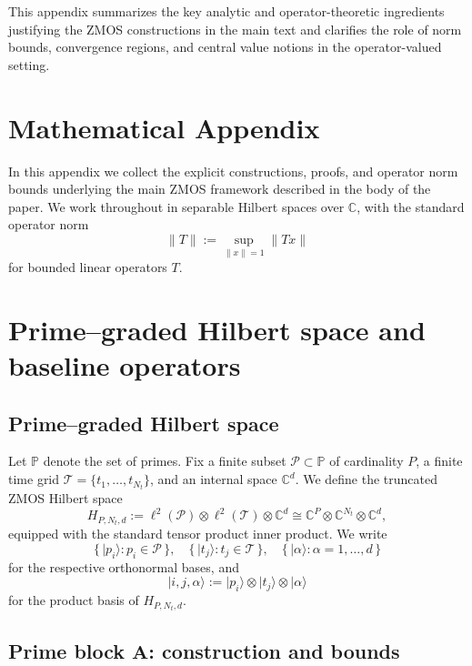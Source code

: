 \documentclass[11pt]{article}
\begin{document}
\bigskip

This appendix summarizes the key analytic and operator-theoretic
ingredients justifying the ZMOS constructions in the main text and
clarifies the role of norm bounds, convergence regions, and central
value notions in the operator-valued setting.

\appendix
\section*{Mathematical Appendix}

In this appendix we collect the explicit constructions, proofs, and operator norm bounds underlying the main ZMOS framework described in the body of the paper.
We work throughout in separable Hilbert spaces over $\mathbb{C}$, with the standard operator norm
\[
\|T\| := \sup_{\|x\|=1} \|Tx\|
\]
for bounded linear operators $T$.

\section{Prime–graded Hilbert space and baseline operators}
\label{app:prime-graded}

\subsection{Prime–graded Hilbert space}

Let $\mathbb{P}$ denote the set of primes.
Fix a finite subset $\mathcal{P} \subset \mathbb{P}$ of cardinality $P$, a finite time grid $\mathcal{T} = \{t_1,\dots,t_{N_t}\}$, and an internal space $\mathbb{C}^d$.
We define the truncated ZMOS Hilbert space
\[
H_{P,N_t,d}
  := \ell^2(\mathcal{P}) \otimes \ell^2(\mathcal{T}) \otimes \mathbb{C}^d
  \cong \mathbb{C}^P \otimes \mathbb{C}^{N_t} \otimes \mathbb{C}^d,
\]
equipped with the standard tensor product inner product.
We write
\[
\bigl\{\,\lvert p_i\rangle : p_i \in \mathcal{P}\,\bigr\},\quad
\bigl\{\,\lvert t_j\rangle : t_j \in \mathcal{T}\,\bigr\},\quad
\bigl\{\,\lvert \alpha\rangle : \alpha=1,\dots,d\,\bigr\}
\]
for the respective orthonormal bases, and
\[
\lvert i,j,\alpha\rangle := \lvert p_i\rangle \otimes \lvert t_j\rangle \otimes \lvert \alpha\rangle
\]
for the product basis of $H_{P,N_t,d}$.

\subsection{Prime block \texorpdfstring{$\mathbf{A}$}{A}: construction and bounds}
\end{document}
